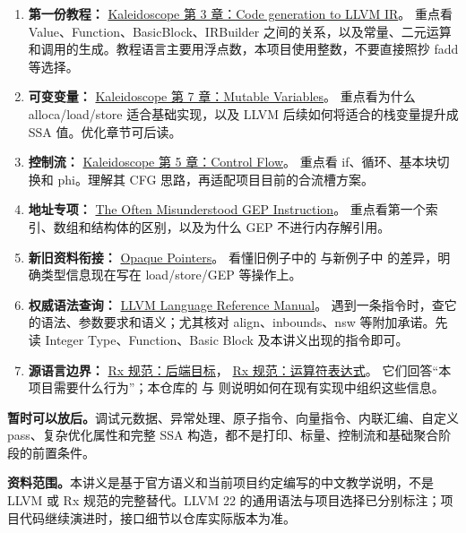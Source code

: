\begin{enumerate}
 \item \textbf{第一份教程：}
 \href{https://releases.llvm.org/22.1.0/docs/tutorial/MyFirstLanguageFrontend/LangImpl03.html}{Kaleidoscope 第 3 章：Code generation to LLVM IR}。
 重点看 Value、Function、BasicBlock、IRBuilder 之间的关系，以及常量、二元运算和调用的生成。教程语言主要用浮点数，本项目使用整数，不要直接照抄 fadd 等选择。
 \item \textbf{可变变量：}
 \href{https://releases.llvm.org/22.1.0/docs/tutorial/MyFirstLanguageFrontend/LangImpl07.html}{Kaleidoscope 第 7 章：Mutable Variables}。
 重点看为什么 alloca/load/store 适合基础实现，以及 LLVM 后续如何将适合的栈变量提升成 SSA 值。优化章节可后读。
 \item \textbf{控制流：}
 \href{https://releases.llvm.org/22.1.0/docs/tutorial/MyFirstLanguageFrontend/LangImpl05.html}{Kaleidoscope 第 5 章：Control Flow}。
 重点看 if、循环、基本块切换和 phi。理解其 CFG 思路，再适配项目目前的合流槽方案。
 \item \textbf{地址专项：}
 \href{https://releases.llvm.org/22.1.0/docs/GetElementPtr.html}{The Often Misunderstood GEP Instruction}。
 重点看第一个索引、数组和结构体的区别，以及为什么 GEP 不进行内存解引用。
 \item \textbf{新旧资料衔接：}
 \href{https://releases.llvm.org/22.1.0/docs/OpaquePointers.html}{Opaque Pointers}。
 看懂旧例子中的  与新例子中  的差异，明确类型信息现在写在 load/store/GEP 等操作上。
 \item \textbf{权威语法查询：}
 \href{https://releases.llvm.org/22.1.0/docs/LangRef.html}{LLVM Language Reference Manual}。
 遇到一条指令时，查它的语法、参数要求和语义；尤其核对 align、inbounds、nsw 等附加承诺。先读 Integer Type、Function、Basic Block 及本讲义出现的指令即可。
 \item \textbf{源语言边界：}
 \href{https://github.com/ACMClassCourse-2025/rx-compiler-specification/blob/master/src/backend.md}{Rx 规范：后端目标}，
 \href{https://github.com/ACMClassCourse-2025/rx-compiler-specification/blob/master/src/expressions/operator-expr.md}{Rx 规范：运算符表达式}。
 它们回答“本项目需要什么行为”；本仓库的  与  则说明如何在现有实现中组织这些信息。
\end{enumerate}

\textbf{暂时可以放后。}调试元数据、异常处理、原子指令、向量指令、内联汇编、自定义 pass、复杂优化属性和完整 SSA 构造，都不是打印、标量、控制流和基础聚合阶段的前置条件。

\textbf{资料范围。}本讲义是基于官方语义和当前项目约定编写的中文教学说明，不是 LLVM 或 Rx 规范的完整替代。LLVM 22 的通用语法与项目选择已分别标注；项目代码继续演进时，接口细节以仓库实际版本为准。
